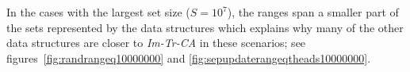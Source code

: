 \documentclass[a4paper,UKenglish]{oasics-v2016}
\begin{document}
In the cases with the largest set size ($S=10^7$), the ranges span a smaller part of the sets represented by the data structures which explains why many of the other data structures are closer to \emph{Im-Tr-CA} in these scenarios; see figures~\ref{fig:randrangeq10000000} and \ref{fig:sepupdaterangeqtheads10000000}.


%


\end{document}
